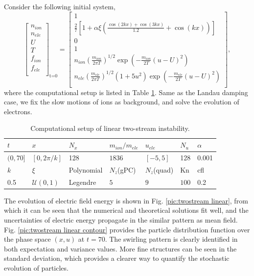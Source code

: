 \documentclass[preprint,3p,12pt,sort&compress]{elsarticle}
\begin{document}
Consider the following initial system,
\begin{equation*}
\left[\begin{array}{c}
n_{ion} \\
n_{ele} \\
U \\
T \\
f_{ion} \\
f_{ele} \\
\end{array}\right]_{\text {t=0}}=\left[\begin{array}{c}
1 \\
\frac{2}{7} \left[1+\alpha \xi \left(\frac{\cos (2 k x)+\cos (3 k x)}{1.2}+\cos (k x)\right)\right] \\
0 \\
1 \\
n_{ion} \left(\frac{m_{ion}}{2\pi T}\right)^{1/2} \exp\left(-\frac{m_{ion}}{2 T} (u-U)^2\right) \\
n_{ele} \left(\frac{m_{ele}}{2\pi T}\right)^{1/2} \left(1+5 u^{2}\right) \exp\left(-\frac{m_{ele}}{2 T} (u-U)^2\right) \\
\end{array}\right],
\end{equation*}
where the computational setup is listed in Table \ref{tab:linear twostream}.
Same as the Landau damping case, we fix the slow motions of ions as background, and solve the evolution of electrons.
\begin{table}[htbp]
	\caption{Computational setup of linear two-stream instability.} 
	\centering
	\begin{tabular}{lllllll} 
		\toprule 
		$t$ & $x$ & $N_x$ & $m_{ion}/m_{ele}$ & $u_{ele}$ & $N_u$ & $\alpha$ \\ 
		\midrule 
		$(0,70]$ & $[0,2\pi/k]$ & 128 & $1836$ & $[-5,5]$ & 128 & 0.001 \\ 
		\midrule 
		$k$ & $\xi$ & Polynomial & $N_z$(gPC) & $N_z$(quad) & Kn & cfl \\ 
		\midrule 
		0.5 & $\mathcal U(0,1)$ & Legendre & $5$ & $9$ & $100$  & 0.2   \\ 
		\bottomrule 
	\end{tabular} 
	\label{tab:linear twostream}
\end{table}

The evolution of electric field energy is shown in Fig. \ref{pic:twostream linear}, from which it can be seen that the numerical and theoretical solutions \cite{chen2012introduction} fit well,
and the uncertainties of electric energy propagate in the similar pattern as mean field.
Fig. \ref{pic:twostream linear contour} provides the particle distribution function over the phase space $(x,u)$ at $t=70$.
The swirling pattern is clearly identified in both expectation and variance values.
More fine structures can be seen in the standard deviation, which provides a clearer way to quantify the stochastic evolution of particles.
\end{document}
